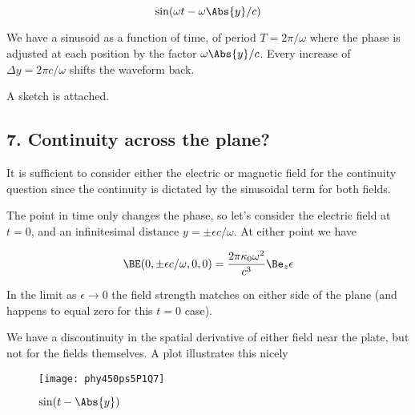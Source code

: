 \begin{equation}\label{eqn:relElectroDynProblemSet5P1:n}
\sin( \omega t - \omega \Abs{y}/c )
\end{equation}

We have a sinusoid as a function of time, of period $T = 2 \pi/\omega$ where the phase is adjusted at each position by the factor $\omega \Abs{y}/c$.  Every increase of $\Delta y = 2 \pi c/\omega$ shifts the waveform back.

A sketch is attached.

\subsection{7. Continuity across the plane?}

It is sufficient to consider either the electric or magnetic field for the continuity question since the continuity is dictated by the sinusoidal term for both fields.

The point in time only changes the phase, so let's consider the electric field at $t=0$, and an infinitesimal distance $y = \pm \epsilon c/\omega$.  At either point we have

\begin{equation}\label{eqn:relElectroDynProblemSet5P1:n}
\BE(0, \pm \epsilon c/\omega, 0, 0) = \frac{ 2 \pi \kappa_0 \omega^2 }{c^3} \Be_z \epsilon
\end{equation}

In the limit as $\epsilon \rightarrow 0$ the field strength matches on either side of the plane (and happens to equal zero for this $t= 0$ case).

We have a discontinuity in the spatial derivative of either field near the plate, but not for the fields themselves.  A plot illustrates this nicely

\begin{figure}[htp]
\centering
\texttt{[image: phy450ps5P1Q7]}
\caption{$\sin(t - \Abs{y})$}\label{fig:phy450ps5P1Q7}
\end{figure}

